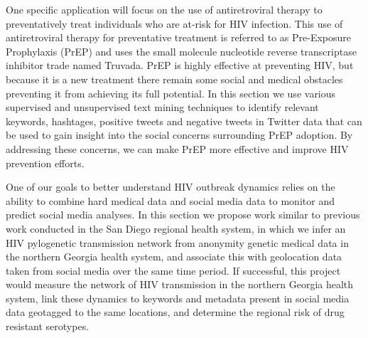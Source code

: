 



One specific application will focus on the use of antiretroviral therapy to preventatively treat individuals who are at-risk for HIV infection. This use of antiretroviral therapy for preventative treatment is referred to as Pre-Exposure Prophylaxis (PrEP) and uses the small molecule nucleotide reverse transcriptase inhibitor trade named Truvada. PrEP is highly effective at preventing HIV, but because it is a new treatment there remain some social and medical obstacles preventing it from achieving its full potential. In this section we use various supervised and unsupervised text mining techniques to identify relevant keywords, hashtages, positive tweets and negative tweets in Twitter data that can be used to gain insight into the social concerns surrounding PrEP adoption. By addressing these concerns, we can make PrEP more effective and improve HIV prevention efforts.

One of our goals to better understand HIV outbreak dynamics relies on the ability to combine hard medical data and social media data to monitor and predict social media analyses. In this section we propose work similar to previous work conducted in the San Diego regional health system, in which we infer an HIV pylogenetic transmission network from anonymity genetic medical data in the northern Georgia health system, and associate this with geolocation data taken from social media over the same time period. If successful, this project would measure the network of HIV transmission in the northern Georgia health system, link these dynamics to keywords and metadata present in social media data geotagged to the same locations, and determine the regional risk of drug resistant serotypes.


